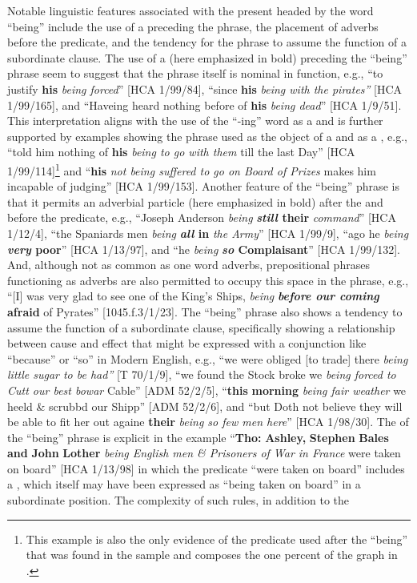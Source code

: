 Notable linguistic features associated with the present  headed by the word “being” include the use of a   preceding the phrase, the placement of adverbs before the predicate, and the tendency for the phrase to assume the function of a subordinate clause. The use of a   (here emphasized in bold) preceding the “being” phrase seem to suggest that the phrase itself is nominal in function, e.g., “to justify \textbf{his} \textit{being forced}” [HCA 1/99/84], “since \textbf{his} \textit{being with the pirates”} [HCA 1/99/165], and “Haveing heard nothing before of \textbf{his} \textit{being dead}” [HCA 1/9/51]. This interpretation aligns with the use of the “-ing” word as a  and is further supported by examples showing the phrase used as the object of a  and as a , e.g., “told him nothing of \textbf{his} \textit{being to go with them} till the last Day” [HCA 1/99/114]\footnote{This example is also the only evidence of the  predicate used after the  “being” that was found in the sample and composes the one percent of the graph in .}  and “\textbf{his} \textit{not being suffered to go on Board of Prizes} makes him incapable of judging” [HCA 1/99/153].  Another feature of the “being” phrase is that it permits an adverbial particle (here emphasized in bold) after the  and before the predicate, e.g., “Joseph Anderson \textit{being} \textbf{\textit{still} their} \textit{command}” [HCA 1/12/4], “the Spaniards men \textit{being} \textbf{\textit{all} in} \textit{the Army}” [HCA 1/99/9], “ago he \textit{being} \textbf{\textit{very} poor}” [HCA 1/13/97], and “he \textit{being} \textbf{\textit{so} Complaisant}” [HCA 1/99/132]. And, although not as common as one word adverbs, prepositional phrases functioning as adverbs are also permitted to occupy this space in the phrase, e.g., “[I] was very glad to see one of the King’s Ships, \textit{being} \textbf{\textit{before our coming} afraid} of Pyrates” [1045.f.3/1/23]. The “being” phrase also shows a tendency to assume the function of a subordinate clause, specifically showing a relationship between cause and effect that might be expressed with a conjunction like “because” or “so” in Modern English, e.g., “we were obliged [to trade] there \textit{being little sugar to be had”} [T 70/1/9], “we found the Stock broke we \textit{being forced to Cutt our best bowar} Cable” [ADM 52/2/5], “\textbf{this} \textbf{morning} \textit{being fair weather} we heeld \& scrubbd our Shipp” [ADM 52/2/6], and “but Doth not believe they will be able to fit her out againe \textbf{their} \textit{being so few men here}” [HCA 1/98/30]. The  of the “being” phrase is explicit in the example “\textbf{Tho:} \textbf{Ashley,} \textbf{Stephen} \textbf{Bales} \textbf{and} \textbf{John} \textbf{Lother} \textit{being English men \& Prisoners of War in France} were taken on board” [HCA 1/13/98] in which the  predicate “were taken on board” includes a , which itself may have been expressed as “being taken on board” in a subordinate position. The complexity of such  rules, in addition to the 